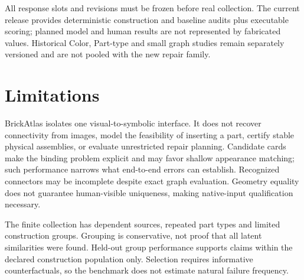 \documentclass[10pt,twocolumn,letterpaper]{article}
\begin{document}
All response slots and revisions must be frozen before real
collection. The current release provides deterministic construction
and baseline audits plus executable scoring; planned model and human
results are not represented by fabricated values. Historical Color,
Part-type and small graph studies remain separately versioned and
are not pooled with the new repair family.

\section{Limitations}
BrickAtlas isolates one visual-to-symbolic interface. It does not
recover connectivity from images, model the feasibility of inserting
a part, certify stable physical assemblies, or evaluate unrestricted
repair planning. Candidate cards make the binding problem explicit
and may favor shallow appearance matching; such performance narrows
what end-to-end errors can establish.
Recognized connectors may be incomplete despite exact graph
evaluation. Geometry equality does not guarantee human-visible
uniqueness, making native-input qualification necessary.

The finite collection has dependent sources, repeated part types and
limited construction groups. Grouping is conservative, not proof
that all latent similarities were found. Held-out group performance
supports claims within the declared construction population only.
Selection requires informative counterfactuals, so the benchmark
does not estimate natural failure frequency.

\clearpage
{\small


}
\end{document}
